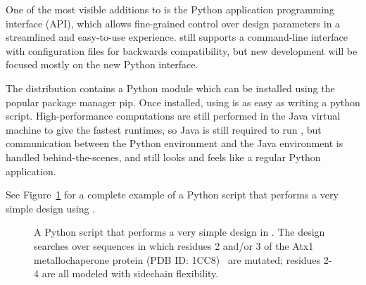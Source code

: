 
One of the most visible additions to  is the Python application programming interface (API), which allows fine-grained control over design parameters in a streamlined and easy-to-use experience.  still supports a command-line interface with configuration files for backwards compatibility, but new development will be focused mostly on the new Python interface. %

The  distribution contains a Python module which can be installed using the popular package manager {\sc pip}. Once installed, using  is as easy as writing a python script. High-performance computations are still performed in the Java virtual machine to give the fastest runtimes, so Java is still required to run , but communication between the Python environment and the Java environment is handled behind-the-scenes, and  still looks and feels like a regular Python application.

See Figure~\ref{fig:python} for a complete example of a Python script that performs a very simple design using .

\begin{figure}
{
	
}
\caption{A Python script that performs a very simple design in .  The design searches over sequences in which residues 2 and/or 3 of the Atx1 metallochaperone protein (PDB ID: 1CC8)~\cite{1CC8} are mutated; residues 2-4 are all modeled with sidechain flexibility.  }
\label{fig:python}
\end{figure}
